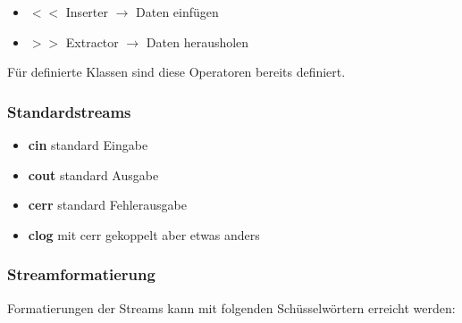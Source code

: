 \begin{itemize}[itemsep=1pt, parsep=0pt]
    \item \textbf{$<<$} Inserter $\rightarrow$  Daten einfügen
    \item \textbf{$>>$} Extractor $\rightarrow$ Daten herausholen
\end{itemize}

Für definierte Klassen sind diese Operatoren bereits definiert.

\subsubsection{Standardstreams}

\begin{itemize}[itemsep=1pt, parsep=0pt]
    \item \textbf{cin} standard Eingabe
    \item \textbf{cout} standard Ausgabe
    \item \textbf{cerr} standard Fehlerausgabe
    \item \textbf{clog} mit cerr gekoppelt aber etwas anders
\end{itemize}

\subsubsection{Streamformatierung}

Formatierungen der Streams kann mit folgenden Schüsselwörtern erreicht werden:


